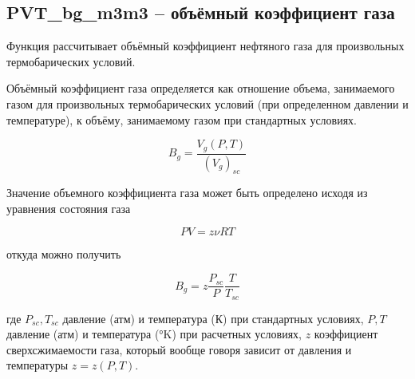 \subsection{PVT\_bg\_m3m3 – объёмный коэффициент газа}
Функция рассчитывает объёмный коэффициент нефтяного газа для произвольных термобарических условий. 

Объёмный коэффициент газа определяется как отношение объема, занимаемого газом для произвольных термобарических условий (при определенном давлении и температуре), к объёму, занимаемому газом при стандартных условиях. 

$$B_g = \frac{V_g(P,T)}{(V_g)_{sc}}$$

Значение объемного коэффициента газа может быть определено исходя из уравнения состояния газа

$$ PV = z \nu RT  $$

откуда можно получить 

$$ B_g = z \frac{P_{sc}}{P} \frac{T}{T_{sc}} $$

где $P_{sc}, T_{sc}$ давление (атм) и температура (К) при стандартных условиях, $P,T$ давление (атм) и температура (°K) при расчетных условиях, $z$ коэффициент сверхсжимаемости газа, который вообще говоря зависит от давления и температуры $z = z(P,T)$. 


\newcommand{\DataFile}{data/Bg_P_data.txt}

